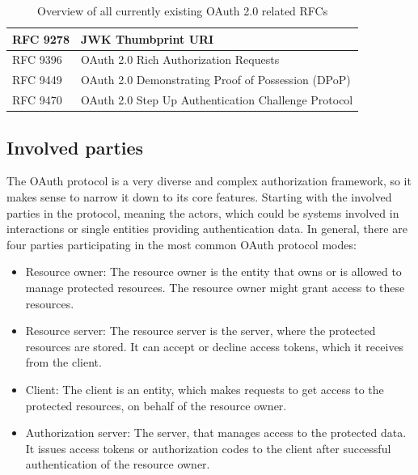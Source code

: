 \documentclass[
    fontsize=12pt,
    headings=small,
    parskip=half,           %
    bibliography=totoc,
    numbers=noenddot,       %
    open=any,               %
    ]{scrreprt}
\begin{document}
\begin{table}[H]
{\begin{tabular}{@{}ll@{}}
	\multicolumn{1}{|l|}{RFC 9278} & \multicolumn{1}{l|}{JWK Thumbprint URI}                                                             \\ \midrule
	\multicolumn{1}{|l|}{RFC 9396} & \multicolumn{1}{l|}{OAuth 2.0 Rich Authorization Requests}                                          \\ \midrule
	\multicolumn{1}{|l|}{RFC 9449} & \multicolumn{1}{l|}{OAuth 2.0 Demonstrating Proof of Possession (DPoP)}                             \\ \midrule
	\multicolumn{1}{|l|}{RFC 9470} & \multicolumn{1}{l|}{OAuth 2.0 Step Up Authentication Challenge Protocol}                            \\ \bottomrule
	\end{tabular}%
	}
	\caption{Overview of all currently existing OAuth 2.0 related  RFCs}
	\label{tab:OAuth_RFC}
\end{table}


\subsection{Involved parties}
The OAuth protocol is a very diverse and complex authorization framework, so it makes sense to narrow it down to its core
features. Starting with the involved parties in the protocol, meaning the actors, which could be systems involved in interactions or single entities providing authentication data. In general, there
are four parties participating in the most common OAuth protocol modes:

\begin{itemize} 

    \item Resource owner: The resource owner is the entity that owns or is allowed to manage protected resources. The resource owner might grant access to these resources. 

    \item Resource server: The resource server is the server, where the protected resources are stored. It can accept or decline access tokens, which it receives from the client. 

    \item Client: The client is an entity, which makes requests to get access to the protected resources, on behalf of the resource owner. 
        
    \item Authorization server: The server, that manages access to the protected data. It issues access tokens or authorization codes to the client after successful authentication of the resource owner. 

\end{itemize}
\end{document}

